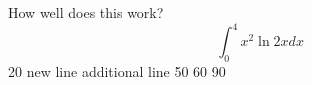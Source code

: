 \documentclass{article}
\begin{document}
How well does this work?
$$\int_0^4 x^2 \ln{2x}dx$$
20
new line
additional line
50
60
90
\end{document}
